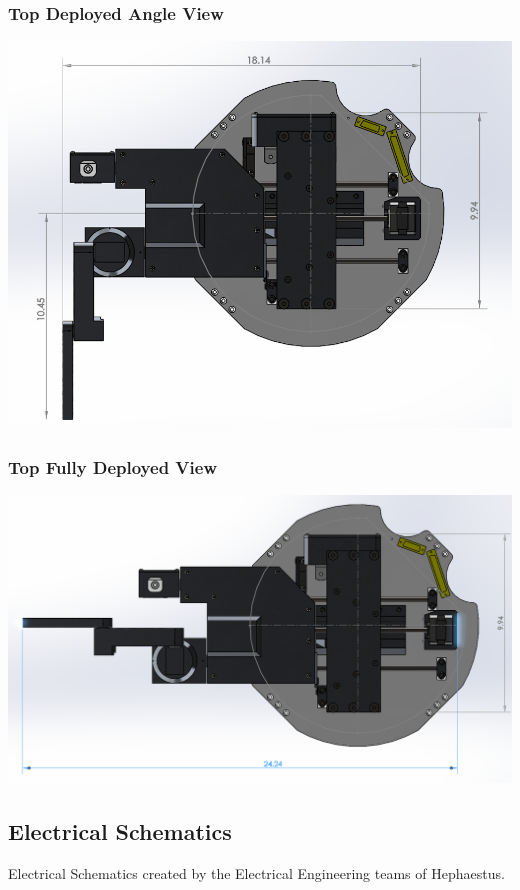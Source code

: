 \subsubsection{Top Deployed Angle View}
\includegraphics[width=\textwidth]{./images/CAD/TOP_DEPLOYED_ANGLE}
\subsubsection{Top Fully Deployed View}
\includegraphics[width=\textwidth]{./images/CAD/TOP_DEPLOYED_FULL}

\subsection{Electrical Schematics}
Electrical Schematics created by the Electrical Engineering teams of Hephaestus.

